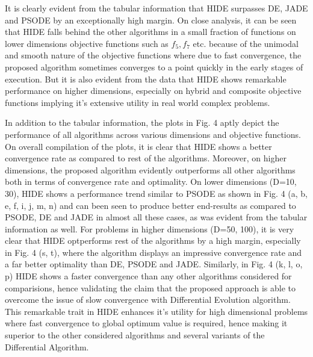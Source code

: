It is clearly evident from the tabular information that HIDE surpasses DE, JADE and PSODE by an exceptionally high margin. On close analysis, it can be seen that HIDE falls behind the other algorithms in a small fraction of functions on lower dimensions objective functions such as $f_5, f_7$ etc. because of the unimodal and smooth nature of the objective functions where due to fast convergence, the proposed algorithm sometimes converges to a point quickly in the early stages of execution. But it is also evident from the data that HIDE shows remarkable performance on higher dimensions, especially on hybrid and composite objective functions implying it's extensive utility in real world complex problems.

In addition to the tabular information, the plots in Fig. 4 aptly depict the performance of all algorithms across various dimensions and objective functions.
On overall compilation of the plots, it is clear that HIDE shows a better convergence rate as compared to rest of the algorithms. Moreover, on higher dimensions, the proposed algorithm evidently outperforms all other algorithms both in terms of convergence rate and optimality.
On lower dimensions (D=10, 30), HIDE shows a performance trend similar to PSODE as shown in Fig. 4 (a, b, e, f, i, j, m, n) and can been seen to produce better end-results as compared to PSODE, DE and JADE in almost all these cases, as was evident from the tabular information as well.
For problems in higher dimensions (D=50, 100), it is very clear that HIDE optperforms rest of the algorithms by a high margin, especially in Fig. 4 (s, t), where the algorithm displays an impressive convergence rate and a far better optimality than DE, PSODE and JADE. Similarly, in Fig. 4 (k, l, o, p) HIDE shows a faster convergence than any other algorithms considered for comparisions, hence validating the claim that the proposed approach is able to overcome the issue of slow convergence with Differential Evolution algorithm.
This remarkable trait in HIDE enhances it's utility for high dimensional problems where fast convergence to global optimum value is required, hence making it superior to the other considered algorithms and several variants of the Differential Algorithm.

